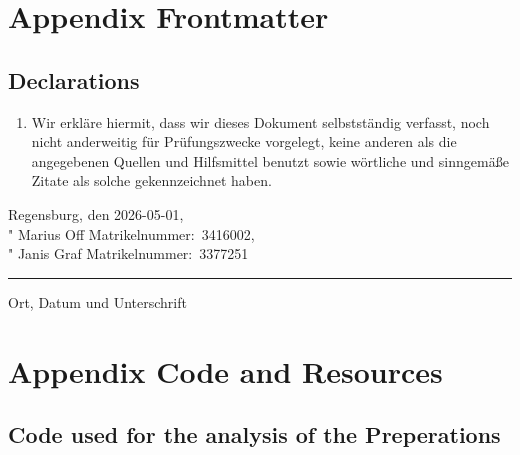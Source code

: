 \documentclass[12pt, oneside, a4paper]{scrreprt}
\begin{document}
            \cleardoublepage







    \appendix
        
    \chapter{Appendix Frontmatter}

        \section{Declarations}\label{app:statutory}

            \begin{enumerate}
                \item Wir erkläre hiermit, dass wir dieses Dokument selbstständig verfasst, noch nicht anderweitig für Prüfungszwecke vorgelegt, keine anderen als die angegebenen Quellen und Hilfsmittel benutzt sowie wörtliche und sinngemäße Zitate als solche gekennzeichnet haben.
            \end{enumerate}

            \vskip22mm
            Regensburg, den 2026-05-01, \\
            "\hskip6cm Marius Off\hskip2cm Matrikelnummer:~3416002,\\
            "\hskip6cm Janis Graf\hskip2cm Matrikelnummer:~3377251
            \vskip1mm
            \hrule
            \vskip1mm
            {\footnotesize Ort, Datum und Unterschrift}

            \vspace{12mm}

            \cleardoublepage

        \listoffigures


            \cleardoublepage

    \chapter{Appendix Code and Resources}



            \section{Code used for the analysis of the Preperations}
            
\end{document}
